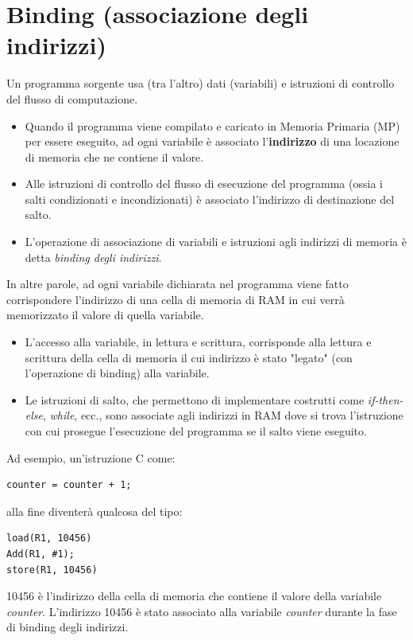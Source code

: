 \section{Binding (associazione degli indirizzi)}
Un programma sorgente usa (tra l'altro) dati (variabili) e
istruzioni di controllo del flusso di computazione.
\begin{itemize}
    \item Quando il programma viene compilato e caricato in
    Memoria Primaria (MP) per essere eseguito, ad ogni
    variabile è associato l'\textbf{indirizzo} di una locazione di
    memoria che ne contiene il valore.
    \item Alle istruzioni di controllo del flusso di esecuzione del
    programma (ossia i salti condizionati e incondizionati) è
    associato l'indirizzo di destinazione del salto.
    \item L'operazione di associazione di variabili e istruzioni agli
    indirizzi di memoria è detta \textit{binding degli indirizzi}.
\end{itemize}

In altre parole, ad ogni variabile dichiarata nel programma viene fatto corrispondere l'indirizzo di una cella di memoria di RAM in cui verrà memorizzato il valore di quella variabile.
\begin{itemize}
    \item L'accesso alla variabile, in lettura e scrittura, corrisponde
    alla lettura e scrittura della cella di memoria il cui indirizzo
    è stato "legato" (con l'operazione di binding) alla variabile.
    \item Le istruzioni di salto, che permettono di implementare
    costrutti come \textit{if-then-else}, \textit{while}, ecc., sono associate agli
    indirizzi in RAM dove si trova l'istruzione con cui prosegue
    l'esecuzione del programma se il salto viene eseguito.
\end{itemize}

Ad esempio, un'istruzione C come:
\begin{verbatim}
counter = counter + 1;
\end{verbatim}
alla fine diventerà qualcosa del tipo:
\begin{verbatim}
load(R1, 10456)
Add(R1, #1);
store(R1, 10456)
\end{verbatim}
10456 è l'indirizzo della cella di memoria che contiene il
valore della variabile \textit{counter}. L'indirizzo 10456 è stato
associato alla variabile \textit{counter} durante la fase di binding
degli indirizzi.


